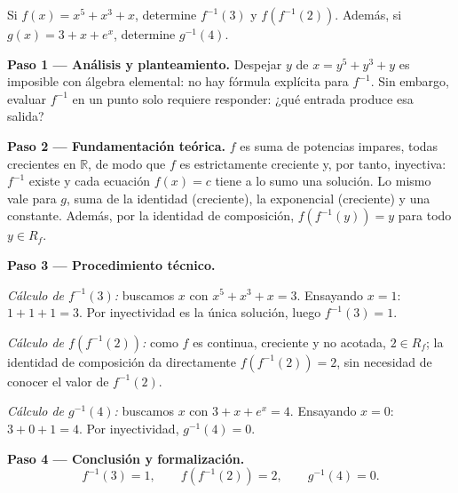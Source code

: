 \begin{example} Si $f(x) = x^5 + x^3 + x$, determine $f^{-1}(3)$ y
$f(f^{-1}(2))$. Además, si $g(x) = 3 + x + e^x$, determine $g^{-1}(4)$.

\begin{myproof}
\textbf{Paso 1 — Análisis y planteamiento.}
Despejar $y$ de $x = y^5 + y^3 + y$ es imposible con álgebra elemental: no
hay fórmula explícita para $f^{-1}$. Sin embargo, evaluar $f^{-1}$ en un
punto solo requiere responder: ¿qué entrada produce esa salida?

\textbf{Paso 2 — Fundamentación teórica.}
$f$ es suma de potencias impares, todas crecientes en $\mathbb{R}$, de modo
que $f$ es estrictamente creciente y, por tanto, inyectiva: $f^{-1}$ existe
y cada ecuación $f(x) = c$ tiene a lo sumo una solución. Lo mismo vale para
$g$, suma de la identidad (creciente), la exponencial (creciente) y una
constante. Además, por la identidad de composición, $f(f^{-1}(y)) = y$
para todo $y \in R_f$.

\textbf{Paso 3 — Procedimiento técnico.}

\emph{Cálculo de $f^{-1}(3)$:} buscamos $x$ con $x^5+x^3+x = 3$. Ensayando
$x=1$: $1+1+1 = 3$. Por inyectividad es la única solución, luego
$f^{-1}(3) = 1$.

\emph{Cálculo de $f(f^{-1}(2))$:} como $f$ es continua, creciente y no
acotada, $2 \in R_f$; la identidad de composición da directamente
$f(f^{-1}(2)) = 2$, sin necesidad de conocer el valor de $f^{-1}(2)$.

\emph{Cálculo de $g^{-1}(4)$:} buscamos $x$ con $3 + x + e^x = 4$.
Ensayando $x=0$: $3 + 0 + 1 = 4$. Por inyectividad, $g^{-1}(4) = 0$.

\textbf{Paso 4 — Conclusión y formalización.}
\[
  \boxed{f^{-1}(3) = 1, \qquad f(f^{-1}(2)) = 2, \qquad g^{-1}(4) = 0.}
\]
\end{myproof}
\end{example}

